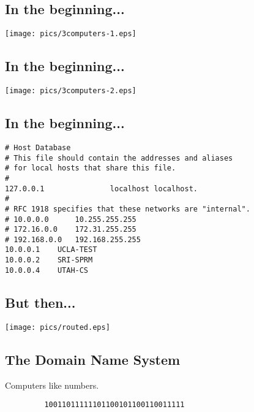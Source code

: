 \documentclass[xga]{xdvislides}
\begin{document}
\subsection{In the beginning...}
\vspace*{\fill}
\begin{center}
	\texttt{[image: pics/3computers-1.eps]} \\
\end{center}
\vspace*{\fill}

\subsection{In the beginning...}
\vspace*{\fill}
\begin{center}
	\texttt{[image: pics/3computers-2.eps]} \\
\end{center}
\vspace*{\fill}

\subsection{In the beginning...}
\begin{verbatim}
# Host Database
# This file should contain the addresses and aliases
# for local hosts that share this file.
#
127.0.0.1               localhost localhost.
#
# RFC 1918 specifies that these networks are "internal".
# 10.0.0.0      10.255.255.255
# 172.16.0.0    172.31.255.255
# 192.168.0.0   192.168.255.255
10.0.0.1	UCLA-TEST
10.0.0.2	SRI-SPRM
10.0.0.4	UTAH-CS
\end{verbatim}


\subsection{But then...}
\vspace*{\fill}
\begin{center}
	\texttt{[image: pics/routed.eps]} \\
\end{center}
\vspace*{\fill}

\subsection{The Domain Name System}
\vspace{.5in}
\begin{center}
	\Huge
	Computers like numbers. \\
\vspace{.5in}
\begin{verbatim}
         10011011111101100101100110011111
\end{verbatim}
\end{center}
\Normalsize
\end{document}
